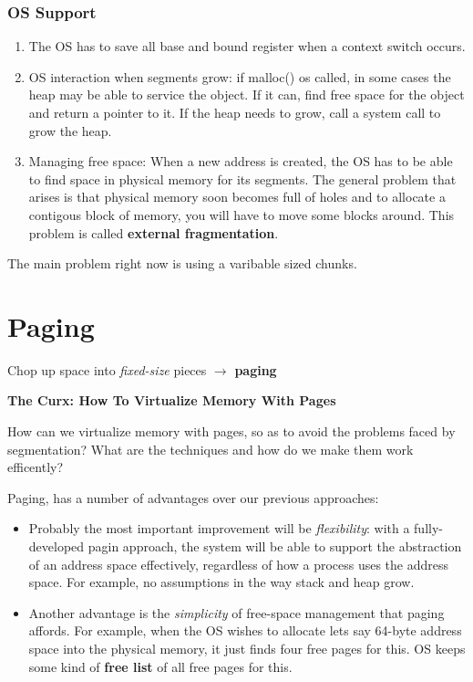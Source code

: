 \subsubsection{OS Support}

\begin{enumerate}
    \item The OS has to save all base and bound register when a context
        switch occurs.
    \item OS interaction when segments grow: if malloc() os called, in some
        cases the heap may be able to service the object. If it can, find
        free space for the object and return a pointer to it. If the heap
        needs to grow, call a system call to grow the heap.
    \item Managing free space: When a new address is created, the OS has to be
        able to find space in physical memory for its segments. The general
        problem that arises is that physical memory soon becomes full of holes 
        and to allocate a contigous block of memory, you will have to move some
        blocks around. This problem is called \textbf{external fragmentation}.
\end{enumerate}

The main problem right now is using a varibable sized chunks.

\section{Paging}

Chop up space into \textit{fixed-size} pieces $\rightarrow$ \textbf{paging}\\

\begin{tcolorbox}
    \textbf{The Curx: How To Virtualize Memory With Pages}

    How can we virtualize memory with pages, so as to avoid the problems 
    faced by segmentation? What are the techniques and how do we make them work
    efficently?
\end{tcolorbox}

Paging, has a number of advantages over our previous approaches:

\begin{itemize}
    \item Probably the most important improvement will be \textit{flexibility}:
        with a fully-developed pagin approach, the system will be able to 
        support the abstraction of an address space effectively, regardless
        of how a process uses the address space. For example, no assumptions
        in the way stack and heap grow.
    \item Another advantage is the \textit{simplicity} of free-space management
        that paging affords. For example, when the OS wishes to allocate lets
        say 64-byte address space into the physical memory, it just finds
        four free pages for this. OS keeps some kind of \textbf{free list}
        of all free pages for this.
\end{itemize}

